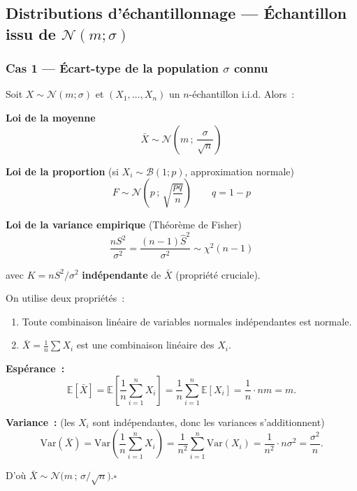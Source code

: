 \documentclass[11pt,a4paper]{article}
\newcommand{\N}{\mathcal{N}}
\newcommand{\B}{\mathcal{B}}
\newcommand{\E}{\mathbb{E}}
\newcommand{\Var}{\mathrm{Var}}
\begin{document}
\subsection{Distributions d'\'echantillonnage --- \'Echantillon issu de $\N(m;\sigma)$}

\subsubsection{Cas 1 --- \'Ecart-type de la population $\sigma$ connu}

\begin{thmbox}
Soit $X \sim \N(m;\sigma)$ et $(X_1,\ldots,X_n)$ un $n$-\'echantillon i.i.d. Alors~:

\medskip
\textbf{Loi de la moyenne}
$$\boxed{\bar{X} \sim \N\!\left(m\,;\,\frac{\sigma}{\sqrt{n}}\right)}$$

\textbf{Loi de la proportion} \hfill (si $X_i \sim \B(1;p)$, approximation normale)
$$\boxed{F \sim \N\!\left(p\,;\,\sqrt{\frac{pq}{n}}\right)} \qquad q=1-p$$

\textbf{Loi de la variance empirique} \hfill (Th\'eor\`eme de Fisher)
$$\boxed{\frac{nS^2}{\sigma^2} = \frac{(n-1)\hat{S}^2}{\sigma^2} \sim \chi^2(n-1)}$$

avec $K = nS^2/\sigma^2$ \textbf{ind\'ependante} de $\bar{X}$ (propri\'et\'e cruciale).
\end{thmbox}

\begin{demobox}
On utilise deux propri\'et\'es~:
\begin{enumerate}
  \item Toute combinaison lin\'eaire de variables normales ind\'ependantes est normale.
  \item $\bar{X} = \frac{1}{n}\sum X_i$ est une combinaison lin\'eaire des $X_i$.
\end{enumerate}

\textbf{Esp\'erance~:}
$$\E[\bar{X}] = \E\!\left[\frac{1}{n}\sum_{i=1}^n X_i\right]
  = \frac{1}{n}\sum_{i=1}^n \E[X_i] = \frac{1}{n}\cdot nm = m.$$

\textbf{Variance~:} (les $X_i$ sont ind\'ependantes, donc les variances s'additionnent)
$$\Var(\bar{X}) = \Var\!\left(\frac{1}{n}\sum_{i=1}^n X_i\right)
  = \frac{1}{n^2}\sum_{i=1}^n \Var(X_i) = \frac{1}{n^2}\cdot n\sigma^2 = \frac{\sigma^2}{n}.$$

D'o\`u $\bar{X} \sim \N\!\bigl(m\,;\,\sigma/\sqrt{n}\bigr)$.\hfill$\square$
\end{demobox}
\end{document}
